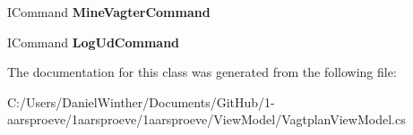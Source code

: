\begin{DoxyCompactItemize}
\item 
\hypertarget{class__1aarsproeve_1_1_view_model_1_1_vagtplan_view_model_abded4dcbd3699986defbf179b9d52001}{}I\+Command {\bfseries Mine\+Vagter\+Command}\label{class__1aarsproeve_1_1_view_model_1_1_vagtplan_view_model_abded4dcbd3699986defbf179b9d52001}

\item 
\hypertarget{class__1aarsproeve_1_1_view_model_1_1_vagtplan_view_model_aadc2e0233944328d65644e49b449f89b}{}I\+Command {\bfseries Log\+Ud\+Command}\label{class__1aarsproeve_1_1_view_model_1_1_vagtplan_view_model_aadc2e0233944328d65644e49b449f89b}

\end{DoxyCompactItemize}


The documentation for this class was generated from the following file\+:\begin{DoxyCompactItemize}
\item 
C\+:/\+Users/\+Daniel\+Winther/\+Documents/\+Git\+Hub/1-\/aarsproeve/1aarsproeve/1aarsproeve/\+View\+Model/Vagtplan\+View\+Model.\+cs\end{DoxyCompactItemize}
